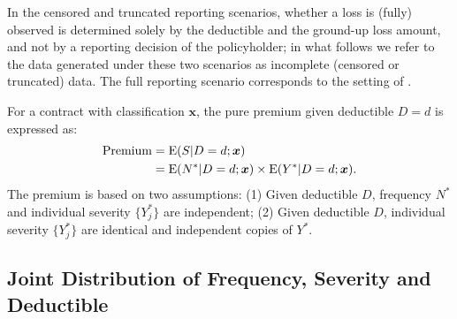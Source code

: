 \documentclass[11pt]{article}
\newcommand{\rev}[1]{{\color{blue}#1}}
\begin{document}
\rev{In the censored and truncated reporting scenarios, whether a loss is (fully) observed is determined solely by the deductible and the ground-up loss amount, and not by a reporting decision of the policyholder; in what follows we refer to the data generated under these two scenarios as incomplete (censored or truncated) data. The full reporting scenario corresponds to the setting of \citet{shi2022copula}.}

For a contract with classification $\bm{x}$, the pure premium given deductible $D=d$ is expressed as:
\begin{align*}
	{\rm Premium} &= {\rm E}(S|D=d;\bm{x})\\
    & = {\rm E}(N^*|D=d;\bm{x}) \times {\rm E}(Y^*|D=d;\bm{x}).
\end{align*}
The premium is based on two assumptions: (1) Given deductible $D$, frequency $N^*$ and individual severity $\{Y^*_j\}$ are independent; (2) Given deductible $D$, individual severity $\{Y^*_j\}$ are identical and independent copies of $Y^*$. 

\subsection{Joint Distribution of Frequency, Severity and Deductible}
\end{document}
